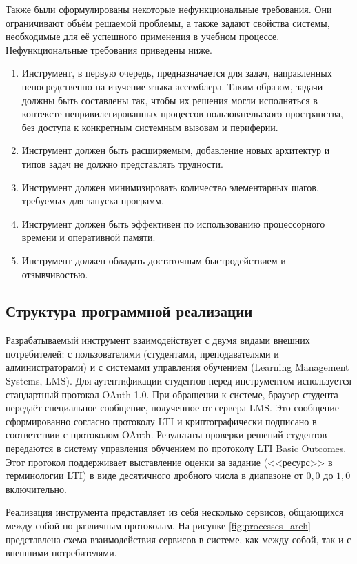 \documentclass[a4paper,article,14pt]{extarticle}
\begin{document}
Также были сформулированы некоторые нефункциональные требования. Они ограничивают объём решаемой проблемы, а также задают свойства системы, необходимые для её успешного применения в учебном процессе. Нефункциональные требования приведены ниже.

\begin{enumerate}
    \item Инструмент, в первую очередь, предназначается для задач, направленных непосредственно на изучение языка ассемблера. Таким образом, задачи должны быть составлены так, чтобы их решения могли исполняться в контексте непривилегированных процессов пользовательского пространства, без доступа к конкретным системным вызовам и периферии.
    \item Инструмент должен быть расширяемым, добавление новых архитектур и типов задач не должно представлять трудности.
    \item Инструмент должен минимизировать количество элементарных шагов, требуемых для запуска программ.
    \item Инструмент должен быть эффективен по использованию процессорного времени и оперативной памяти.
    \item Инструмент должен обладать достаточным быстродействием и отзывчивостью.
\end{enumerate}

\subsection{Структура программной реализации}

Разрабатываемый инструмент взаимодействует с двумя видами внешних потребителей: с пользователями (студентами, преподавателями и администраторами) и с системами управления обучением (Learning Management Systems, LMS). Для аутентификации студентов перед инструментом используется стандартный протокол OAuth 1.0\cite{oauthrfc}. При обращении к системе, браузер студента передаёт специальное сообщение, полученное от сервера LMS. Это сообщение сформированно согласно протоколу LTI\cite{lti} и криптографически подписано в соответствии с протоколом OAuth. Результаты проверки решений студентов передаются в систему управления обучением по протоколу LTI Basic Outcomes\cite{ltioutcomes}. Этот протокол поддерживает выставление оценки за задание (<<ресурс>> в терминологии LTI) в виде десятичного дробного числа в диапазоне от $0{,}0$ до $1{,}0$ включительно.

Реализация инструмента представляет из себя несколько сервисов, общающихся между собой по различным протоколам. На рисунке \ref{fig:processes_arch} представлена схема взаимодействия сервисов в системе, как между собой, так и с внешними потребителями.
\end{document}
